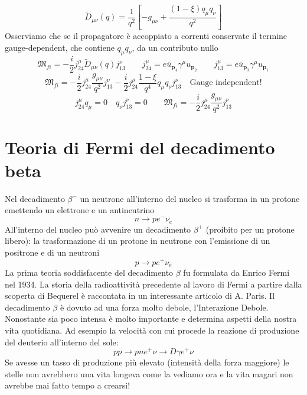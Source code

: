 $$
\tilde{D}_{\mu\nu}(q) = \frac{1}{q^2} \left[ -g_{\mu\nu} + \frac{(1 - \xi) q_\mu q_\nu}{q^2} \right]
$$
Osserviamo che se il propagatore è accoppiato a correnti conservate il termine gauge-dependent, che contiene $q_\mu q_\nu$, da un contributo nullo
$$
\mathfrak{M}_{fi} = - \frac{i}{2} j_{24}^\mu \tilde{D}_{\mu\nu}(q) j_{13}^\nu \qquad j_{24}^\mu = e \overline{u}_{\mathbf{p}_4} \gamma^\mu u_{\mathbf{p}_2} \qquad j_{13}^\mu = e \overline{u}_{\mathbf{p}_3} \gamma^\mu u_{\mathbf{p}_1}
$$
$$
\mathfrak{M}_{fi} = - \frac{i}{2} j_{24}^\mu \frac{g_{\mu\nu}}{q^2} j_{13}^\nu - \frac{i}{2} j_{24}^\mu \frac{1 - \xi}{q^4} q_\mu q_\nu j_{13}^\nu \quad \text{Gauge independent!}
$$
$$
j_{24}^\mu q_\mu = 0 \quad q_\nu j_{13}^\nu = 0 \qquad \mathfrak{M}_{fi} = - \frac{i}{2} j_{24}^\mu \frac{g_{\mu\nu}}{q^2} j_{13}^\nu
$$
\section{Teoria di Fermi del decadimento beta}
Nel decadimento $\beta^-$ un neutrone all'interno del nucleo si trasforma in un protone emettendo un elettrone e un antineutrino
$$
n\to pe^- \overline{\nu_e}
$$
All'interno del nucleo può avvenire un decadimento $\beta^+$ (proibito per un protone libero): la trasformazione di un protone in neutrone con l'emissione di un positrone e di un neutroni
$$
p\to pe^+ \nu_e
$$
La prima teoria soddisfacente del decadimento $\beta$ fu formulata da Enrico Fermi nel 1934. La storia della radioattività precedente al lavoro di Fermi a partire dalla scoperta di Bequerel è raccontata in un interessante articolo di A. Paris. Il decadimento $\beta$ è dovuto ad una forza molto debole, l'Interazione Debole. Nonostante sia poco intensa è molto importante e determina aspetti della nostra vita quotidiana. Ad esempio la velocità con cui procede la reazione di produzione del deuterio all'interno del sole:
$$
pp\to pne^+\nu \to D\gamma e^+ \nu
$$
Se avesse un tasso di produzione più elevato (intensità della forza maggiore) le stelle non avrebbero una vita longeva come la vediamo ora e la vita magari non avrebbe mai fatto tempo a crearsi!
